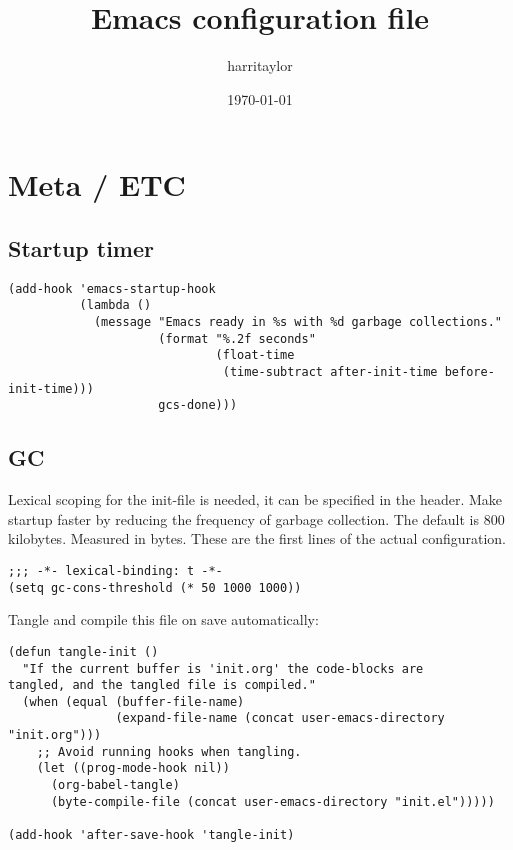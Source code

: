 \documentclass[11pt]{article}
\author{harritaylor}
\date{\today}
\title{Emacs configuration file}
\begin{document}
\maketitle
\tableofcontents


\section{Meta / ETC}
\label{sec:org798036b}
\subsection{Startup timer}
\label{sec:orga8da4a3}

\begin{verbatim}
(add-hook 'emacs-startup-hook
          (lambda ()
            (message "Emacs ready in %s with %d garbage collections."
                     (format "%.2f seconds"
                             (float-time
                              (time-subtract after-init-time before-init-time)))
                     gcs-done)))
\end{verbatim}

\subsection{GC}
\label{sec:orge02c909}

Lexical scoping for the init-file is needed, it can be specified in the header. Make startup faster by reducing the frequency of garbage collection.  The default is 800 kilobytes.  Measured in bytes. These are the first lines of the actual configuration.

\begin{verbatim}
;;; -*- lexical-binding: t -*-
(setq gc-cons-threshold (* 50 1000 1000))
\end{verbatim}


Tangle and compile this file on save automatically:

\begin{verbatim}
(defun tangle-init ()
  "If the current buffer is 'init.org' the code-blocks are
tangled, and the tangled file is compiled."
  (when (equal (buffer-file-name)
               (expand-file-name (concat user-emacs-directory "init.org")))
    ;; Avoid running hooks when tangling.
    (let ((prog-mode-hook nil))
      (org-babel-tangle)
      (byte-compile-file (concat user-emacs-directory "init.el")))))

(add-hook 'after-save-hook 'tangle-init)
\end{verbatim}
\end{document}
